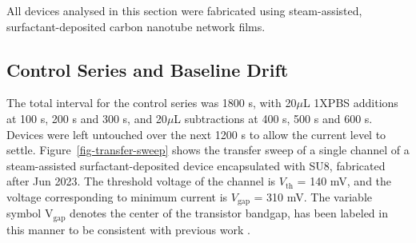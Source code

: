 \documentclass[
  a4paper,
]{scrbook}
\begin{document}
All devices analysed in this section were fabricated using
steam-assisted, surfactant-deposited carbon nanotube network films.

\hypertarget{sec-baseline-drift}{%
\subsection{Control Series and Baseline
Drift}\label{sec-baseline-drift}}

The total interval for the control series was 1800 s, with 20\(\mu\)L
1XPBS additions at 100 s, 200 s and 300 s, and 20\(\mu\)L subtractions
at 400 s, 500 s and 600 s. Devices were left untouched over the next
1200 s to allow the current level to settle.
Figure~\ref{fig-transfer-sweep} shows the transfer sweep of a single
channel of a steam-assisted surfactant-deposited device encapsulated
with SU8, fabricated after Jun 2023. The threshold voltage of the
channel is \(V_{\textrm{th}}\) = 140 mV, and the voltage corresponding
to minimum current is \(V_{\textrm{gap}}\) = 310 mV. The variable symbol
V\(_{\textrm{gap}}\) denotes the center of the transistor bandgap, has
been labeled in this manner to be consistent with previous work
\autocite{Heller2009}.
\end{document}
